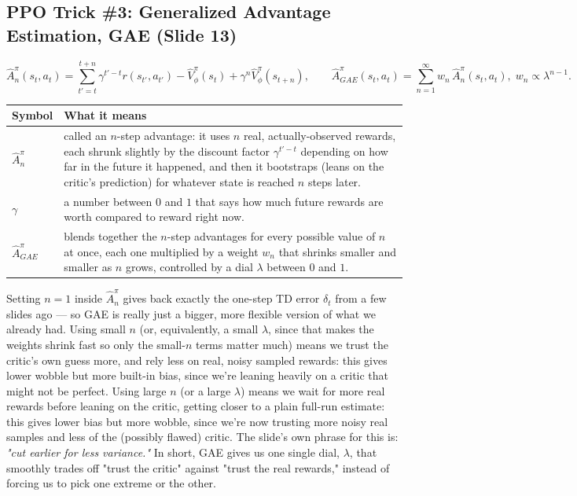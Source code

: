 \documentclass[11pt]{article}
\begin{document}
\subsection{PPO Trick \#3: Generalized Advantage Estimation, GAE (Slide 13)}
\begin{small}
$$\hat A^\pi_n(s_t,a_t) = \sum_{t'=t}^{t+n} \gamma^{t'-t} r(s_{t'},a_{t'}) - \hat V^\pi_\phi(s_t) + \gamma^n \hat V^\pi_\phi(s_{t+n}), \qquad \hat A^\pi_{GAE}(s_t,a_t) = \sum_{n=1}^{\infty} w_n\, \hat A^\pi_n(s_t,a_t), \; w_n \propto \lambda^{n-1}.$$
\end{small}
\begin{center}
\begin{tabular}{@{} >{\raggedright\arraybackslash}p{} >{\raggedright\arraybackslash}p{} @{}}
\toprule
\textbf{Symbol} & \textbf{What it means} \\
\midrule
$\hat A^\pi_n$ & called an $n$-step advantage: it uses $n$ real, actually-observed rewards, each shrunk slightly by the discount factor $\gamma^{t'-t}$ depending on how far in the future it happened, and then it bootstraps (leans on the critic's prediction) for whatever state is reached $n$ steps later. \\
$\gamma$ & a number between $0$ and $1$ that says how much future rewards are worth compared to reward right now. \\
$\hat A^\pi_{GAE}$ & blends together the $n$-step advantages for every possible value of $n$ at once, each one multiplied by a weight $w_n$ that shrinks smaller and smaller as $n$ grows, controlled by a dial $\lambda$ between $0$ and $1$. \\
\bottomrule
\end{tabular}
\end{center}

Setting $n=1$ inside $\hat A^\pi_n$ gives back exactly the one-step TD error $\delta_t$ from a few slides ago --- so GAE is really just a bigger, more flexible version of what we already had. Using small $n$ (or, equivalently, a small $\lambda$, since that makes the weights shrink fast so only the small-$n$ terms matter much) means we trust the critic's own guess more, and rely less on real, noisy sampled rewards: this gives lower wobble but more built-in bias, since we're leaning heavily on a critic that might not be perfect. Using large $n$ (or a large $\lambda$) means we wait for more real rewards before leaning on the critic, getting closer to a plain full-run estimate: this gives lower bias but more wobble, since we're now trusting more noisy real samples and less of the (possibly flawed) critic. The slide's own phrase for this is: \emph{"cut earlier for less variance."} In short, GAE gives us one single dial, $\lambda$, that smoothly trades off "trust the critic" against "trust the real rewards," instead of forcing us to pick one extreme or the other.
\end{document}

